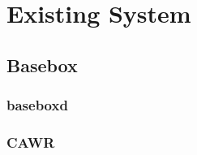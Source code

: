 \chapter{Existing System} \label{chap:system} %

\section {Basebox}

\subsection {baseboxd}
\subsection {CAWR}

